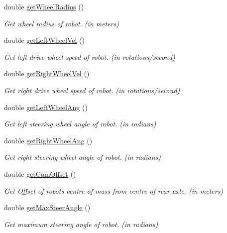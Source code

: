 \begin{DoxyCompactItemize}
double \hyperlink{classRobot_a419b324c8db1f6e7e1dd65b5a15f3049}{get\+Wheel\+Radius} ()
\begin{DoxyCompactList}\small\item\em Get wheel radius of robot. (in meters) \end{DoxyCompactList}\item 
double \hyperlink{classRobot_a99559e14e93539d1deaf5f0405dfce76}{get\+Left\+Wheel\+Vel} ()
\begin{DoxyCompactList}\small\item\em Get left drive wheel speed of robot. (in rotations/second) \end{DoxyCompactList}\item 
double \hyperlink{classRobot_a4596767fd5ee2f6a923523a298d584fb}{get\+Right\+Wheel\+Vel} ()
\begin{DoxyCompactList}\small\item\em Get right drive wheel speed of robot. (in rotations/second) \end{DoxyCompactList}\item 
double \hyperlink{classRobot_a3e230967bf4b167aaa20d442c6c5ceb0}{get\+Left\+Wheel\+Ang} ()
\begin{DoxyCompactList}\small\item\em Get left steering wheel angle of robot. (in radians) \end{DoxyCompactList}\item 
double \hyperlink{classRobot_aaa3dd6bad00b406b62bb58af2dd37ca4}{get\+Right\+Wheel\+Ang} ()
\begin{DoxyCompactList}\small\item\em Get right steering wheel angle of robot. (in radians) \end{DoxyCompactList}\item 
double \hyperlink{classRobot_a7ec7471708cfb59d26baefda819fa26b}{get\+Com\+Offset} ()
\begin{DoxyCompactList}\small\item\em Get Offset of robot\textquotesingle{}s centre of mass from centre of rear axle. (in meters) \end{DoxyCompactList}\item 
double \hyperlink{classRobot_ad51f91ba00dfe4efa1bf0a10ea3213e6}{get\+Max\+Steer\+Angle} ()
\begin{DoxyCompactList}\small\item\em Get maximum steering angle of robot. (in radians) \end{DoxyCompactList}\item 

\end{DoxyCompactItemize}
